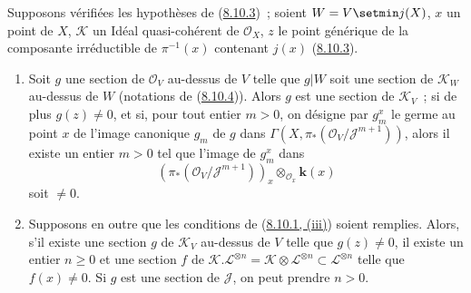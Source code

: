 \begin{corollary}[8.10.5]
\label{II.8.10.5-fr}
Supposons vérifiées les hypothèses de (\hyperref[II.8.10.3-fr]{8.10.3})~;
soient $W=V\setmin j(X)$, $x$ un point de $X$, $\mathcal{K}$ un Idéal
quasi-cohérent de $\mathcal{O}_X$, $z$ le point générique de la composante
irréductible de $\pi^{-1}(x)$ contenant $j(x)$
(\hyperref[II.8.10.3-fr]{8.10.3}).
\begin{enumerate}
  \item[\rm{(i)}] Soit $g$ une section de $\mathcal{O}_V$ au-dessus de $V$
  telle que $g|W$ soit une section de $\mathcal{K}_W$ au-dessus de $W$
  (notations de (\hyperref[II.8.10.4-fr]{8.10.4})). Alors $g$ est une section
  de $\mathcal{K}_V$~; si de plus $g(z)\neq0$, et si, pour tout entier $m>0$,
  on désigne par $g_m^x$ le germe au point $x$ de l'image canonique $g_m$ de
  $g$ dans
  $\Gamma(X,\pi_*(\mathcal{O}_V/\mathcal{J}^{m+1}))$, alors il existe un
  entier $m>0$ tel que l'image de $g_m^x$ dans
  \[
    (\pi_*(\mathcal{O}_V/\mathcal{J}^{m+1}))_x
    \otimes_{\mathcal{O}_x}\boldsymbol{k}(x)
  \]
  soit $\neq0$.
  \item[\rm{(ii)}] Supposons en outre que les conditions de
  (\hyperref[II.8.10.1-fr]{8.10.1, (iii)}) soient remplies. Alors, s'il existe
  une section $g$ de $\mathcal{K}_V$ au-dessus de $V$ telle que $g(z)\neq0$,
  il existe un entier $n\geqslant0$ et une section $f$ de
  $\mathcal{K}.\mathcal{L}^{\otimes n}=
  \mathcal{K}\otimes\mathcal{L}^{\otimes n}\subset\mathcal{L}^{\otimes n}$
  telle que $f(x)\neq0$. Si $g$ est une section de $\mathcal{J}$, on peut
  prendre $n>0$.
\end{enumerate}
\end{corollary}

